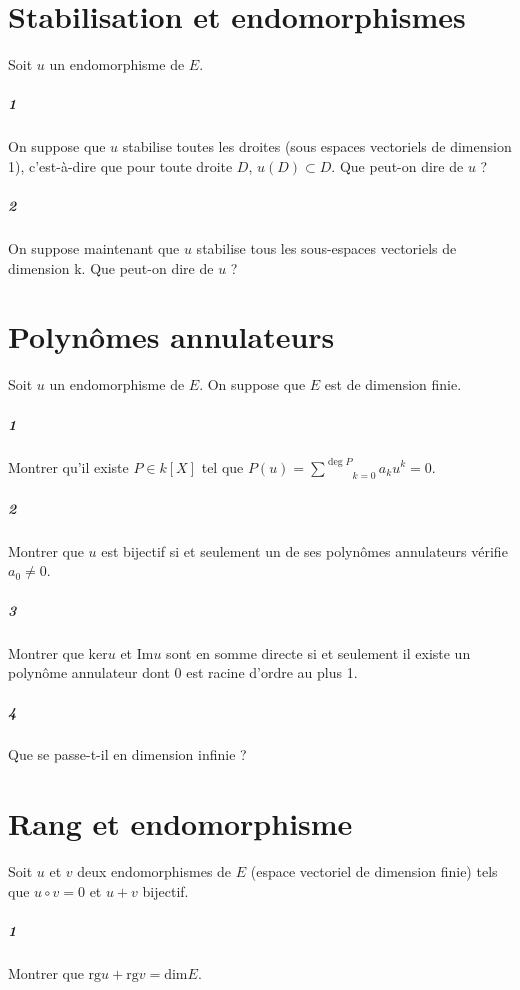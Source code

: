 \documentclass[10pt,a4paper]{article}
\begin{document}
\section{Stabilisation et endomorphismes}
Soit $u$ un endomorphisme de $E$.
\subparagraph{1} On suppose que $u$ stabilise toutes les droites (sous espaces vectoriels de dimension 1), c'est-à-dire que pour toute droite $D$, $u(D) \subset D$. Que peut-on dire de $u$ ?
\subparagraph{2}On suppose maintenant que $u$ stabilise tous les sous-espaces vectoriels de dimension k. Que peut-on dire de $u$ ?

\section{Polynômes annulateurs}
Soit $u$ un endomorphisme de $E$. On suppose que $E$ est de dimension finie.
\subparagraph{1}Montrer qu'il existe $P \in k[X]$ tel que $P(u)= \underset{k=0}{\overset{\deg P}{\sum}}a_k u^k=0.$
\subparagraph{2}Montrer que $u$ est bijectif si et seulement un de ses polynômes annulateurs vérifie $a_0 \neq 0$.
\subparagraph{3}Montrer que $\text{ker}u$ et $\text{Im}u$ sont en somme directe si et seulement il existe un polynôme annulateur dont 0 est racine d'ordre au plus 1.
\subparagraph{4}Que se passe-t-il en dimension infinie ?

\section{Rang et endomorphisme}
Soit $u $ et $v$ deux endomorphismes de $E$ (espace vectoriel de dimension finie) tels que $u\circ v=0$ et $u+v$ bijectif.
\subparagraph{1}Montrer que $\text{rg} u +\text{rg}v= \text{dim}E$.
\end{document}
